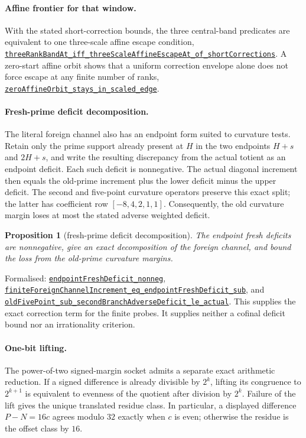 \documentclass[11pt]{article}
\newcommand{\commit}{81150c1c6fdd4cd51e76d3aa0de344341e0e9e7c}
\newcommand{\repobase}{https://github.com/wcook04/plectis-lean-erdos249-257/blob/\commit}
\newcommand{\PK}{Erdos249257}
\newcommand{\lref}[3]{\href{\repobase/\PK/#1\#L#2}{\nolinkurl{#3}}}
\newcommand{\lrefx}[3]{\href{\repobase/\PK/#1\#L#2}{\nolinkurl{#3}}}
\newtheorem{proposition}[theorem]{Proposition}
\theoremstyle{definition}
\theoremstyle{remark}
\begin{document}
\paragraph{Affine frontier for that window.}\label{res:flexibleoddaffine}
With the stated short-correction bounds, the three central-band predicates are
equivalent to one three-scale affine escape condition,
\lref{DiagonalFlexibleOddWindowAffine.lean}{236}{threeRankBandAt_iff_threeScaleAffineEscapeAt_of_shortCorrections}.
A zero-start affine orbit shows that a uniform correction envelope alone does
not force escape at any finite number of ranks,
\lrefx{DiagonalFlexibleOddWindowAffine.lean}{225}{zeroAffineOrbit_stays_in_scaled_edge}.

\paragraph{Fresh-prime deficit decomposition.}  The literal foreign channel
also has an endpoint form suited to curvature tests.  Retain only the prime
support already present at $H$ in the two endpoints $H+s$ and $2H+s$, and
write the resulting discrepancy from the actual totient as an endpoint
deficit.  Each such deficit is nonnegative.  The actual diagonal increment
then equals the old-prime increment plus the lower deficit minus the upper
deficit.  The second and five-point curvature operators preserve this exact
split; the latter has coefficient row $[-8,4,2,1,1]$.  Consequently, the old
curvature margin loses at most the stated adverse weighted deficit.

\begin{proposition}[fresh-prime deficit decomposition]\label{res:freshprimedeficit}
The endpoint fresh deficits are nonnegative, give an exact decomposition of
the foreign channel, and bound the loss from the old-prime curvature margins.
\end{proposition}
\noindent Formalised:
\lref{FreshPrimeDeficitDecomposition.lean}{91}{endpointFreshDeficit_nonneg},
\lref{FreshPrimeDeficitDecomposition.lean}{184}{finiteForeignChannelIncrement_eq_endpointFreshDeficit_sub},
and
\lref{FreshPrimeDeficitDecomposition.lean}{269}{oldFivePoint_sub_secondBranchAdverseDeficit_le_actual}.
This supplies the exact correction term for the finite probes.  It supplies
neither a cofinal deficit bound nor an irrationality criterion.

\paragraph{One-bit lifting.}  The power-of-two signed-margin socket admits a
separate exact arithmetic reduction.  If a signed difference is already
divisible by $2^k$, lifting its congruence to $2^{k+1}$ is equivalent to
evenness of the quotient after division by $2^k$.  Failure of the lift gives
the unique translated residue class.  In particular, a displayed difference
$P-N=16c$ agrees modulo $32$ exactly when $c$ is even; otherwise the residue
is the offset class by $16$.
\end{document}
